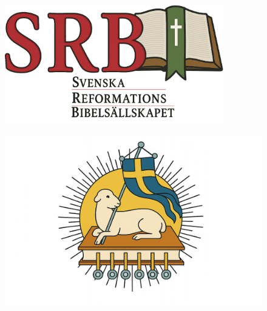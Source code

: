 \begin{figure}[h!]
  \centering
  \begin{adjustbox}{center}
    \includegraphics[width=0.85\textwidth]{misc/srb_logo_2025/main_srb_v16_lower_text_innershadow.png}
  \end{adjustbox}
\end{figure}

\begin{figure}[h!]
  \centering
  \begin{adjustbox}{center}
    \includegraphics[width=1.05\textwidth]{misc/kanmanlitapAbible2000/dragen_ut_fAr_svensk_flagg_01.png}
  \end{adjustbox}
\end{figure}
